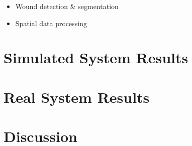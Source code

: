 \begin{itemize}
    \item Wound detection & segmentation
    \item Spatial data processing
\end{itemize}



\section{Simulated System Results}
\label{sec:system_validation_simulation_results}



\section{Real System Results}
\label{sec:system_validation_real_results}



\section{Discussion}
\label{sec:system_validation_discussion}

